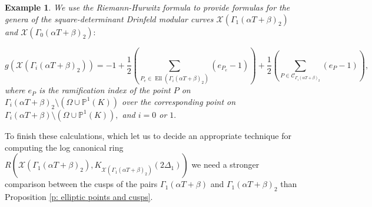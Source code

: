\documentclass[11pt]{amsart}
\newtheorem{example}[theorem]{Example}
\theoremstyle{definition}
\numberwithin{equation}{section}
\newcommand{\cC}{\mathcal{C}}		%
\newcommand{\sX}{\mathscr{X}}		%
\newcommand{\bbP}{\mathbb{P}}		%
\begin{document}
\begin{example}
	We use the Riemann-Hurwitz formula to provide formulas for the genera of the square-determinant Drinfeld modular curves $\sX(\Gamma_1(\alpha T+\beta)_2)$ and $\sX(\Gamma_0(\alpha T+\beta)_2):$
	
	\[g(\sX(\Gamma_i(\alpha T+\beta)_2))=-1+\frac{1}{2}\left(\sum_{P_e\in \operatorname{Ell}(\Gamma_i(\alpha T+\beta)_2)} (e_{P_e}-1)\right)+\frac{1}{2}\left(\sum_{P\in \cC_{\Gamma_i(\alpha T+\beta)_2}}(e_P-1)\right), \]
	where $e_P$ is the ramification index of the point $P$ on $\Gamma_i(\alpha T+\beta)_2\setminus(\Omega\cup\bbP^1(K))$ over the corresponding point on $\Gamma_i(\alpha T+\beta)\setminus(\Omega\cup\bbP^1(K)),$ and $i=0$ or $1.$\\ 
\end{example}

To finish these calculations, which let us to decide an appropriate technique for computing the log canonical ring $R(\sX(\Gamma_1(\alpha T+\beta)_2), K_{\sX(\Gamma_1(\alpha T+\beta)_2)}(2\Delta_1))$ we need a stronger comparison between the cusps of the pairs $\Gamma_1(\alpha T+\beta)$ and $\Gamma_1(\alpha T+\beta)_2$ than Proposition \ref{p: elliptic points and cusps}.\\
\end{document}
